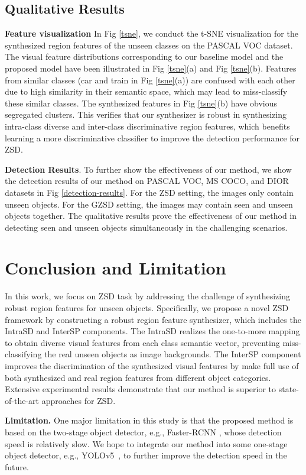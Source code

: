 \documentclass[10pt,twocolumn,letterpaper]{article}
\begin{document}
\subsection{Qualitative Results}
\textbf{Feature visualization} In Fig \ref{tsne}, we conduct the t-SNE \cite{van2008visualizing} visualization for the synthesized region features of the unseen classes on the PASCAL VOC dataset. The visual feature distributions corresponding to our baseline model and the proposed model have been illustrated in Fig \ref{tsne}(a) and Fig \ref{tsne}(b). Features from similar classes (car and train in Fig \ref{tsne}(a)) are confused with each other due to high similarity in their semantic space, which may lead to miss-classify these similar classes. The synthesized features in Fig \ref{tsne}(b) have obvious segregated clusters.
This verifies that our synthesizer is robust in synthesizing intra-class diverse and inter-class discriminative region features, which benefits learning a more discriminative classifier to improve the detection performance for ZSD.

\textbf{Detection Results}. To further show the effectiveness of our method, we show the detection results of our method on PASCAL VOC, MS COCO, and DIOR datasets in Fig \ref{detection-results}. For the ZSD setting, the images only contain unseen objects. For the GZSD setting, the images may contain seen and unseen objects together. The qualitative results prove the effectiveness of our method in detecting seen and unseen objects simultaneously in the challenging scenarios.



\section{Conclusion and Limitation}
In this work, we focus on ZSD task by addressing the challenge of synthesizing robust region features for unseen objects.
Specifically, we propose a novel ZSD framework by constructing a robust region feature synthesizer, which includes the IntraSD and InterSP components. The IntraSD realizes the one-to-more mapping to obtain diverse visual features from each class semantic vector, preventing miss-classifying the real unseen objects as image backgrounds. The InterSP component improves the discrimination of the synthesized visual features by make full use of both synthesized and real region features from different object categories. Extensive experimental results demonstrate  that our method is superior to state-of-the-art approaches for ZSD.

\vspace{1mm}
\noindent \textbf{Limitation.} One major limitation in this study is that the proposed method is based on the two-stage object detector, e.g., Faster-RCNN \cite{ren2016faster}, whose detection speed is relatively slow. We hope to integrate our method into some one-stage object detector, e.g., YOLOv5~\cite{jocher2021ultralytics}, to further improve the detection speed in the future.



{\small


}
\end{document}
